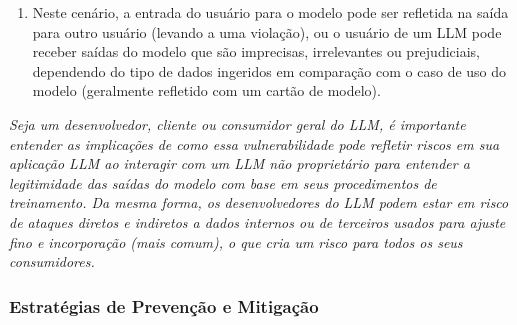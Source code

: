 \documentclass[
]{article}
\providecommand{\tightlist}{%
  \setlength{\itemsep}{0pt}\setlength{\parskip}{0pt}}
\begin{document}
\begin{enumerate}
  \begin{enumerate}
  \def\labelenumii{\arabic{enumii}.}
  \tightlist
  \item
    Neste cenário, a entrada do usuário para o modelo pode ser refletida
    na saída para outro usuário (levando a uma violação), ou o usuário
    de um LLM pode receber saídas do modelo que são imprecisas,
    irrelevantes ou prejudiciais, dependendo do tipo de dados ingeridos
    em comparação com o caso de uso do modelo (geralmente refletido com
    um cartão de modelo).
  \end{enumerate}
\end{enumerate}

\emph{Seja um desenvolvedor, cliente ou consumidor geral do LLM, é
importante entender as implicações de como essa vulnerabilidade pode
refletir riscos em sua aplicação LLM ao interagir com um LLM não
proprietário para entender a legitimidade das saídas do modelo com base
em seus procedimentos de treinamento. Da mesma forma, os desenvolvedores
do LLM podem estar em risco de ataques diretos e indiretos a dados
internos ou de terceiros usados para ajuste fino e incorporação (mais
comum), o que cria um risco para todos os seus consumidores.}

\subsubsection{Estratégias de Prevenção e
Mitigação}\label{estratuxe9gias-de-prevenuxe7uxe3o-e-mitigauxe7uxe3o}
\end{document}
